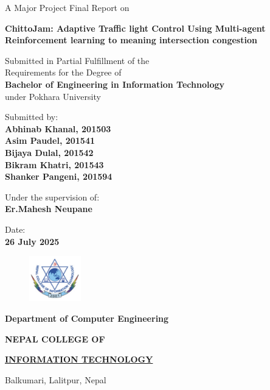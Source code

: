 \documentclass[12pt, a4paper]{report}
\begin{document}
\begin{titlepage}
	\begin{center}
	
	\large%
	A Major Project Final Report on
	
	\vfill 
	\LARGE %
	\textbf{ChittoJam: Adaptive Traffic light Control Using Multi-agent Reinforcement learning to meaning intersection congestion}

	\vfill
	
	\large %
	Submitted in Partial Fulfillment of the \\ 
	Requirements for the Degree of \\ 
	\textbf {Bachelor of Engineering in Information Technology} \\
	under Pokhara University
	
	\vfill
	
	Submitted by: \\ 
	\textbf {Abhinab Khanal, 201503} \\
	\textbf {Asim Paudel, 201541} \\
	\textbf {Bijaya Dulal, 201542} \\
	\textbf {Bikram Khatri, 201543} \\
	\textbf {Shanker Pangeni, 201594} \\
	
	\vfill
	
	Under the supervision of: \\
	\textbf {Er.Mahesh Neupane}
	
	\vfill
	
	Date: \\
	\textbf {26 July 2025}
	
	\vfill
	
	\end{center}
	
	\begin{figure}
	\centering
	\includegraphics[width=0.2\textwidth]{college-logo}
	\end{figure}
	
	\selectfont
	
	\textbf {Department of Computer Engineering}  
	
	\Large %
	\textbf {NEPAL COLLEGE OF} 
	
	\LARGE %
	\textbf {\underline {INFORMATION TECHNOLOGY} }
	
	\small %
	Balkumari, Lalitpur, Nepal
	
	
\end{titlepage}
\end{document}
